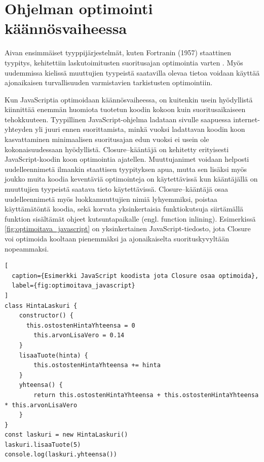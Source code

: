 \section{Ohjelman optimointi käännösvaiheessa}
Aivan ensimmäiset tyyppijärjestelmät, kuten Fortranin (1957) staattinen tyypitys,
kehitettiin laskutoimitusten suoritusajan optimointia varten \cite{TypesAndProgrammingLanguages}.
Myös uudemmissa kielissä muuttujien tyypeistä saatavilla olevaa tietoa
voidaan käyttää ajonaikaisen turvallisuuden varmistavien tarkistusten
optimointiin.

Kun JavaScriptia optimoidaan käännösvaiheessa, on kuitenkin usein hyödyllistä
kiinnittää enemmän huomiota tuotetun koodin kokoon kuin suoritusaikaiseen
tehokkuuteen. Tyypillinen JavaScript-ohjelma ladataan sivulle saapuessa
internet-yhteyden yli juuri ennen suorittamista, minkä vuoksi ladattavan
koodin koon kasvattaminen minimaalisen suoritusajan edun vuoksi ei usein ole
kokonaisuudessaan hyödyllistä. Closure–kääntäjä on kehitetty erityisesti
JavaScript-koodin koon optimointia ajatellen. Muuttujanimet voidaan helposti
uudelleennimetä ilmankin staattisen tyypityksen apua, mutta sen lisäksi myös
joukko muita koodia keventäviä optimointeja on käytettävissä kun kääntäjällä
on muuttujien tyypeistä saatava tieto käytettävissä. Closure–kääntäjä osaa
uudelleennimetä myös luokkamuuttujien nimiä lyhyemmiksi, poistaa
käyttämätöntä koodia, sekä korvata yksinkertaisia funktiokutsuja siirtämällä
funktion sisältämät ohjeet kutsuntapaikalle (engl. function inlining).
Esimerkissä \ref{fig:optimoitava_javascript} on yksinkertainen
JavaScript-tiedosto, jota Closure voi optimoida kooltaan pienemmäksi
ja ajonaikaiselta suorituskyvyltään nopeammaksi.

\begin{lstlisting}[
  caption={Esimerkki JavaScript koodista jota Closure osaa optimoida},
  label={fig:optimoitava_javascript}
]
class HintaLaskuri {
	constructor() {
	  this.ostostenHintaYhteensa = 0
		this.arvonLisaVero = 0.14
	}
	lisaaTuote(hinta) {
		this.ostostenHintaYhteensa += hinta
	}
	yhteensa() {
		return this.ostostenHintaYhteensa + this.ostostenHintaYhteensa * this.arvonLisaVero
	}
}
const laskuri = new HintaLaskuri()
laskuri.lisaaTuote(5)
console.log(laskuri.yhteensa())
\end{lstlisting}

